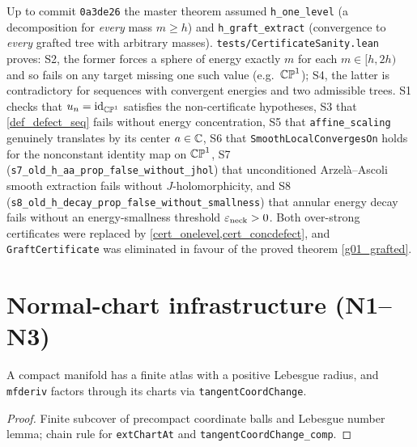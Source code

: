 \begin{remark}
Up to commit \texttt{0a3de26} the master theorem assumed \texttt{h\_one\_level} (a decomposition
for \emph{every} mass $m\ge h$) and \texttt{h\_graft\_extract} (convergence to \emph{every} grafted
tree with arbitrary masses). \texttt{tests/CertificateSanity.lean} proves: S2, the former forces a
sphere of energy exactly $m$ for each $m\in[h,2h)$ and so fails on any target missing one such
value (e.g.\ $\mathbb{CP}^1$); S4, the latter is contradictory for sequences with convergent energies and two
admissible trees. S1 checks that $u_n=\mathrm{id}_{\mathbb{CP}^1}$ satisfies the non-certificate hypotheses,
S3 that \cref{def_defect_seq} fails without energy concentration, S5 that \texttt{affine\_scaling}
genuinely translates by its center $a\in\mathbb{C}$, S6 that \texttt{SmoothLocalConvergesOn} holds for
the nonconstant identity map on $\mathbb{CP}^1$, S7 (\texttt{s7\_old\_h\_aa\_prop\_false\_without\_jhol}) that
unconditioned Arzel\`a--Ascoli smooth extraction fails without $J$-holomorphicity, and S8
(\texttt{s8\_old\_h\_decay\_prop\_false\_without\_smallness}) that annular energy decay fails without an
energy-smallness threshold $\varepsilon_{\mathrm{neck}}>0$. Both over-strong certificates were replaced by
\cref{cert_onelevel,cert_concdefect}, and \texttt{GraftCertificate} was eliminated in favour of the
proved theorem \cref{g01_grafted}.
\end{remark}

\chapter{Normal-chart infrastructure (N1--N3)}
\label{chap_remaining}

\begin{theorem}
\label{n1_atlas}
\leanok
{}
A compact manifold has a finite atlas with a positive Lebesgue radius, and \texttt{mfderiv}
factors through its charts via \texttt{tangentCoordChange}.
\end{theorem}
\begin{proof}\leanok Finite subcover of precompact coordinate balls and Lebesgue number lemma;
chain rule for \texttt{extChartAt} and \texttt{tangentCoordChange\_comp}.\end{proof}

